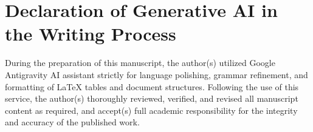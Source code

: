 \documentclass[conference]{IEEEtran}
\begin{document}
\section*{Declaration of Generative AI in the Writing Process}
During the preparation of this manuscript, the author(s) utilized Google Antigravity AI assistant strictly for language polishing, grammar refinement, and formatting of LaTeX tables and document structures. Following the use of this service, the author(s) thoroughly reviewed, verified, and revised all manuscript content as required, and accept(s) full academic responsibility for the integrity and accuracy of the published work.

{\small


}
\end{document}
